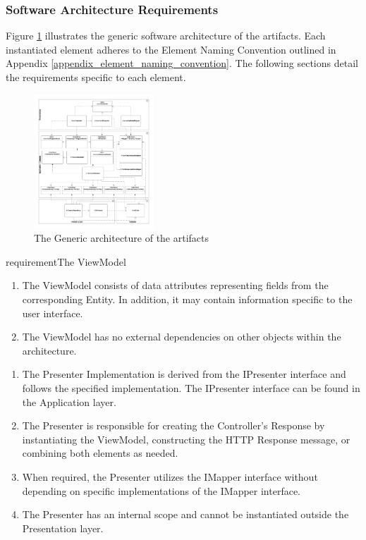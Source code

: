 \subsubsection{Software Architecture Requirements} \label{software_requirements}

Figure \ref{fig_design} illustrates the generic software architecture of the artifacts.
Each instantiated element adheres to the Element Naming Convention outlined in Appendix
\ref{appendix_element_naming_convention}. The following sections detail the requirements
specific to each element.

\begin{figure}[H]
    \centering
    \includegraphics[width=0.4\textwidth]{figures/generic_design.pdf}
    \caption[Generic architecture]{The Generic architecture of the artifacts}
    \label{fig_design}
\end{figure}

requirement{The ViewModel}
\begin{enumerate}[label=\themycounter.\arabic*]
    \item The ViewModel consists of data attributes representing fields from the
    corresponding Entity. In addition, it may contain information specific to the user
    interface.
    \item The ViewModel has no external dependencies on other objects within the
    architecture.
\end{enumerate}

\begin{enumerate}[label=\themycounter.\arabic*]
    \item The Presenter Implementation is derived from the IPresenter interface and
    follows the specified implementation. The IPresenter interface can be found in the
    Application layer.
    \item The Presenter is responsible for creating the Controller's Response by
    instantiating the ViewModel, constructing the HTTP Response message, or combining both
    elements as needed.
    \item When required, the Presenter utilizes the IMapper interface without depending on
    specific implementations of the IMapper interface.
    \item The Presenter has an internal scope and cannot be instantiated outside the
    Presentation layer.
\end{enumerate}

